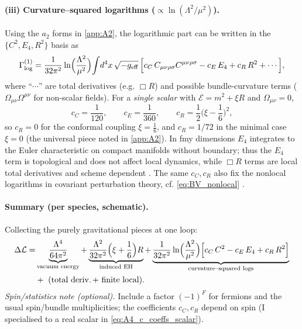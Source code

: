 \documentclass{iopjournal}
\begin{document}
\paragraph{(iii) Curvature–squared logarithms ($\propto \ln(\Lambda^2/\mu^2)$).}
Using the $a_2$ forms in \cref{app:A2}, the logarithmic part can be written in the $\{C^2,E_4,R^2\}$ basis as
\begin{equation}
\Gamma^{(1)}_{\rm log}
=\frac{1}{32\pi^2}\ln\!\Big(\frac{\Lambda^2}{\mu^2}\Big)\!
\int\! d^4x\,\sqrt{-g_{\rm eff}}\,
\Big[
c_C\,C_{\mu\nu\rho\sigma}C^{\mu\nu\rho\sigma}
-c_E\,E_4
+c_R\,R^2
+\cdots
\Big],
\label{eq:A4_logs_basis}
\end{equation}
where ``$\cdots$” are total derivatives (e.g. $\Box R$) and possible bundle-curvature terms ($\Omega_{\mu\nu}\Omega^{\mu\nu}$ for non-scalar fields). For a \emph{single scalar} with $\mathcal{E}=m^2+\xi R$ and $\Omega_{\mu\nu}=0$,
\begin{equation}
c_C=\frac{1}{120},\qquad
c_E=\frac{1}{360},\qquad
c_R=\frac{1}{2}\Big(\xi-\frac{1}{6}\Big)^{\!2},
\label{eq:A4_c_coeffs_scalar}
\end{equation}
so $c_R=0$ for the conformal coupling $\xi=\tfrac{1}{6}$, and $c_R=1/72$ in the minimal case $\xi=0$ (the universal piece noted in \cref{app:A2}). In fmy dimensions $E_4$ integrates to the Euler characteristic on compact manifolds without boundary; thus the $E_4$ term is topological and does not affect local dynamics, while $\Box R$ terms are local total derivatives and scheme dependent \cite{ParkerToms,Vassilevich2003}. The same $c_{C},c_{R}$ also fix the nonlocal logarithms in covariant perturbation theory, cf. \eqref{eq:BV_nonlocal} \cite{BarvinskyVilkovisky1990,Donoghue1994}.

\paragraph{Summary (per species, schematic).}
Collecting the purely gravitational pieces at one loop:
\begin{align}
\Delta\mathcal{L}
=&\underbrace{\frac{\Lambda^4}{64\pi^2}}_{\text{vacuum energy}}
+\underbrace{\frac{\Lambda^2}{32\pi^2}\Big(\xi+\frac{1}{6}\Big)R}_{\text{induced EH}}
+\underbrace{\frac{1}{32\pi^2}\ln\!\Big(\frac{\Lambda^2}{\mu^2}\Big)
\Big[c_C\,C^2-c_E\,E_4+c_R\,R^2\Big]}_{\text{curvature--squared logs}} \notag \\
&+\ \text{(total deriv.\,+ finite local)}.
\label{eq:A4_summary}
\end{align}
\emph{Spin/statistics note (optional).} Include a factor $(-1)^{F}$ for fermions and the usual spin/bundle multiplicities; the coefficients $c_C,c_R$ depend on spin (I specialised to a real scalar in \eqref{eq:A4_c_coeffs_scalar}).
\end{document}
